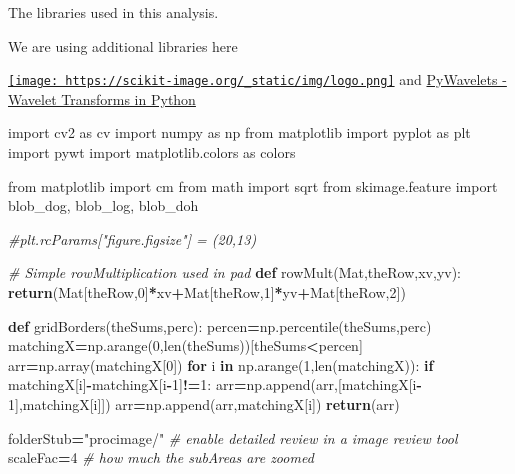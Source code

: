 \documentclass[
]{article}
\newenvironment{Shaded}{\begin{snugshade}}{\end{snugshade}}
\newcommand{\BuiltInTok}[1]{#1}
\newcommand{\CommentTok}[1]{\textcolor[rgb]{0.56,0.35,0.01}{\textit{#1}}}
\newcommand{\ControlFlowTok}[1]{\textcolor[rgb]{0.13,0.29,0.53}{\textbf{#1}}}
\newcommand{\DecValTok}[1]{\textcolor[rgb]{0.00,0.00,0.81}{#1}}
\newcommand{\ImportTok}[1]{#1}
\newcommand{\KeywordTok}[1]{\textcolor[rgb]{0.13,0.29,0.53}{\textbf{#1}}}
\newcommand{\NormalTok}[1]{#1}
\newcommand{\OperatorTok}[1]{\textcolor[rgb]{0.81,0.36,0.00}{\textbf{#1}}}
\newcommand{\StringTok}[1]{\textcolor[rgb]{0.31,0.60,0.02}{#1}}
\begin{document}
The libraries used in this analysis.

We are using additional libraries here

\href{https://scikit-image.org/}{\texttt{[image: https://scikit-image.org/\_static/img/logo.png]}}
and \href{https://pywavelets.readthedocs.io}{PyWavelets - Wavelet
Transforms in Python}

\begin{Shaded}
\begin{Highlighting}[]
\ImportTok{import}\NormalTok{ cv2 }\ImportTok{as}\NormalTok{ cv}
\ImportTok{import}\NormalTok{ numpy }\ImportTok{as}\NormalTok{ np}
\ImportTok{from}\NormalTok{ matplotlib }\ImportTok{import}\NormalTok{ pyplot }\ImportTok{as}\NormalTok{ plt}
\ImportTok{import}\NormalTok{ pywt}
\ImportTok{import}\NormalTok{ matplotlib.colors }\ImportTok{as}\NormalTok{ colors}

\ImportTok{from}\NormalTok{ matplotlib }\ImportTok{import}\NormalTok{ cm}
\ImportTok{from}\NormalTok{ math }\ImportTok{import}\NormalTok{ sqrt}
\ImportTok{from}\NormalTok{ skimage.feature }\ImportTok{import}\NormalTok{ blob\_dog, blob\_log, blob\_doh}

\CommentTok{\#plt.rcParams["figure.figsize"] = (20,13)}

\CommentTok{\# Simple rowMultiplication used in pad }
\KeywordTok{def}\NormalTok{ rowMult(Mat,theRow,xv,yv):}
    \ControlFlowTok{return}\NormalTok{(Mat[theRow,}\DecValTok{0}\NormalTok{]}\OperatorTok{*}\NormalTok{xv}\OperatorTok{+}\NormalTok{Mat[theRow,}\DecValTok{1}\NormalTok{]}\OperatorTok{*}\NormalTok{yv}\OperatorTok{+}\NormalTok{Mat[theRow,}\DecValTok{2}\NormalTok{])}

\KeywordTok{def}\NormalTok{ gridBorders(theSums,perc):}
\NormalTok{  percen}\OperatorTok{=}\NormalTok{np.percentile(theSums,perc)}
\NormalTok{  matchingX}\OperatorTok{=}\NormalTok{np.arange(}\DecValTok{0}\NormalTok{,}\BuiltInTok{len}\NormalTok{(theSums))[theSums}\OperatorTok{\textless{}}\NormalTok{percen]}
\NormalTok{  arr}\OperatorTok{=}\NormalTok{np.array(matchingX[}\DecValTok{0}\NormalTok{])}
  \ControlFlowTok{for}\NormalTok{ i }\KeywordTok{in}\NormalTok{ np.arange(}\DecValTok{1}\NormalTok{,}\BuiltInTok{len}\NormalTok{(matchingX)):}
    \ControlFlowTok{if}\NormalTok{ matchingX[i]}\OperatorTok{{-}}\NormalTok{matchingX[i}\OperatorTok{{-}}\DecValTok{1}\NormalTok{]}\OperatorTok{!=}\DecValTok{1}\NormalTok{:}
\NormalTok{      arr}\OperatorTok{=}\NormalTok{np.append(arr,[matchingX[i}\OperatorTok{{-}}\DecValTok{1}\NormalTok{],matchingX[i]])}
\NormalTok{  arr}\OperatorTok{=}\NormalTok{np.append(arr,matchingX[i])}
  \ControlFlowTok{return}\NormalTok{(arr)}

\NormalTok{folderStub}\OperatorTok{=}\StringTok{"procimage/"} \CommentTok{\# enable detailed review in a image review tool}
\NormalTok{scaleFac}\OperatorTok{=}\DecValTok{4} \CommentTok{\# how much the subAreas are zoomed }
\end{Highlighting}
\end{Shaded}
\end{document}
